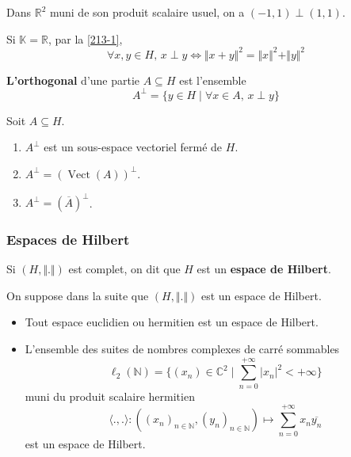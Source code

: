 	\begin{example}
		Dans $\mathbb{R}^2$ muni de son produit scalaire usuel, on a $(-1,1) \perp (1,1)$.
	\end{example}

	\begin{remark}
		Si $\mathbb{K} = \mathbb{R}$, par la \cref{213-1},
		\[ \forall x, y \in H, \, x \perp y \iff \Vert x + y \Vert^2 = \Vert x \Vert^2 + \Vert y \Vert^2 \]
	\end{remark}

	\begin{definition}
		\textbf{L'orthogonal} d'une partie $A \subseteq H$ est l'ensemble
		\[ A^\perp = \{ y \in H \mid \forall x \in A, \, x \perp y \} \]
	\end{definition}


	\begin{proposition}
		Soit $A \subseteq H$.
		\begin{enumerate}[label=(\roman*)]
			\item $A^\perp$ est un sous-espace vectoriel fermé de $H$.
			\item $A^\perp = (\operatorname{Vect}(A))^\perp$.
			\item $A^\perp = (\overline{A})^\perp$.
		\end{enumerate}
	\end{proposition}

	\newpage

	\subsubsection{Espaces de Hilbert}


	\begin{definition}
		Si $(H, \Vert . \Vert)$ est complet, on dit que $H$ est un \textbf{espace de Hilbert}.
	\end{definition}

	On suppose dans la suite que $(H, \Vert . \Vert)$ est un espace de Hilbert.

	\begin{example}
		\begin{itemize}
			\item Tout espace euclidien ou hermitien est un espace de Hilbert.
			\item L'ensemble des suites de nombres complexes de carré sommables
			\[ \ell_2(\mathbb{N}) = \{ (x_n) \in \mathbb{C}^2 \mid \sum_{n=0}^{+\infty} \vert x_n \vert^2 < +\infty \} \]
			muni du produit scalaire hermitien
			\[ \langle ., . \rangle : ((x_n)_{n \in \mathbb{N}},(y_n)_{n \in \mathbb{N}}) \mapsto \sum_{n=0}^{+\infty} x_n \overline{y_n} \]
			est un espace de Hilbert.
		\end{itemize}
	\end{example}

